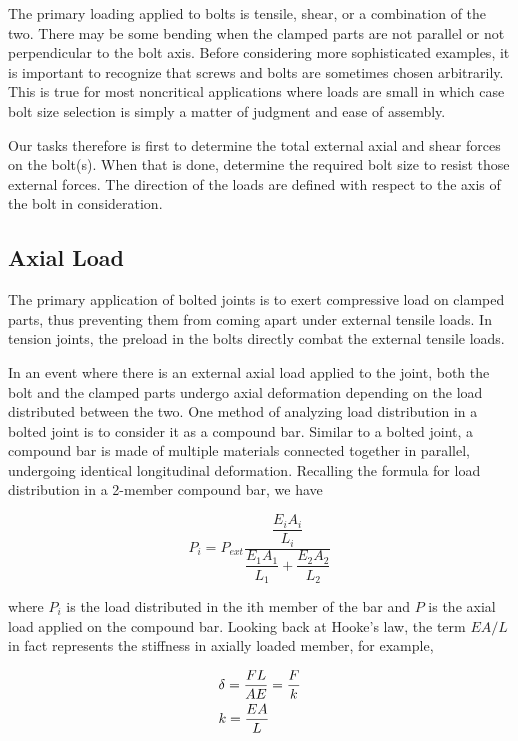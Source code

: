 \documentclass[
10pt,
a4paper,
openany,
svgnames,
]{book}
\begin{document}
The primary loading applied to bolts is tensile, shear, or a combination of the two. There may be some bending when the clamped parts are not parallel or not perpendicular to the bolt axis. Before considering more sophisticated examples, it is important to recognize that screws and bolts are sometimes chosen arbitrarily. This is true for most noncritical applications where loads are small in which case bolt size selection is simply a matter of judgment and ease of assembly.

Our tasks therefore is first to determine the total external axial and shear forces on the bolt(s). When that is done, determine the required bolt size to resist those external forces. The direction of the loads are defined with respect to the axis of the bolt in consideration. 

\subsection{Axial Load}

The primary application of bolted joints is to exert compressive load on clamped parts, thus preventing them from coming apart under external tensile loads. In tension joints, the preload in the bolts directly combat the external tensile loads.


In an event where there is an external axial load applied to the joint, both the bolt and the clamped parts undergo axial deformation depending on the load distributed between the two. One method of analyzing load distribution in a bolted joint is to consider it as a compound bar. Similar to a bolted joint, a compound bar is made of multiple materials connected together in parallel, undergoing identical longitudinal deformation. Recalling the formula for load distribution in a 2-member compound bar, we have

\begin{equation} \label{eqn: 2-member compound bar}
  P_i = P_{ext}\frac{\dfrac{E_iA_i}{L_i}}{\dfrac{E_1A_1}{L_1} + \dfrac{E_2A_2}{L_2}}
\end{equation}

where $P_i$ is the load distributed in the ith member of the bar and $P$ is the axial load applied on the compound bar. Looking back at Hooke’s law, the term $EA/L$ in fact represents the stiffness in axially loaded member, for example,

\[\begin{gathered}
  \delta  = \frac{FL}{AE} = \frac{F}{k} \hfill \\
  k = \frac{EA}{L} \hfill \\ 
\end{gathered} \]
\end{document}
